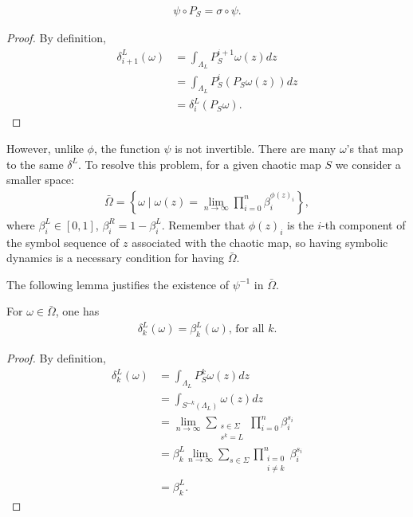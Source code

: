\begin{lemma}
  \begin{eqnarray}
 \psi \circ P_S = \sigma \circ \psi.
  \end{eqnarray}
\end{lemma}
\begin{proof} By definition,
  \begin{align}
      \delta_{i+1}^L (\omega)   &= \int_{\Lambda_L} P_S^{i+1} \omega(z)dz \nonumber\\
                                &= \int_{\Lambda_L} P_S^{i} \left(P_S\omega(z) \right) dz \nonumber\\
                                &=  \delta_{i}^L (P_S \omega).
  \end{align}
\end{proof}

However, unlike $\phi$, the function $\psi$ is not invertible. There are many $\omega$'s that map to the same $\delta^L$. To resolve this problem, for a given chaotic map $S$ we consider a smaller space:
  \begin{eqnarray}
  \label{DefOmegabar}
  \bar{\Omega} = \left\{ \omega \mid \omega(z) = \lim_{n \to \infty} \prod_{i=0}^n \beta^{\phi(z)_i}_i \right\},
  \end{eqnarray}
where $\beta^L_i \in [0,1]$, $\beta^R_i=1-\beta^L_i$. Remember that $\phi(z)_i$ is the $i$-th component of the symbol sequence of $z$ associated with the chaotic map, so having symbolic dynamics is a necessary condition for having $\bar{\Omega}$.

The following lemma justifies the existence of $\psi^{-1}$ in $\bar{\Omega}$.
\begin{lemma} For $\omega \in \bar{\Omega}$, one has
 \begin{eqnarray}
    \delta^L_k(\omega) = \beta^L_k(\omega)  \text{, for all }k.
 \end{eqnarray}
\end{lemma}
\begin{proof} By definition,
 \begin{align}
    \delta_{k}^L (\omega)   &= \int_{\Lambda_L} P_S^{k} \omega(z)dz \nonumber\\
                            &= \int_{S^{-k}(\Lambda_L)} \omega(z)dz \nonumber\\
                            &= \lim_{n \to \infty} \sum_{\substack{s\in \Sigma\\s^k= L }}  \prod_{i=0}^{n} \beta^{s_i}_i \nonumber\\
                            &= \beta_k^L \lim_{n \to \infty} \sum_{s\in \Sigma}  \prod_{\substack{i=0\\ i\neq k}}^{n} \beta^{s_i}_i \nonumber\\
                            &= \beta_k^L.
 \end{align}
\end{proof}


